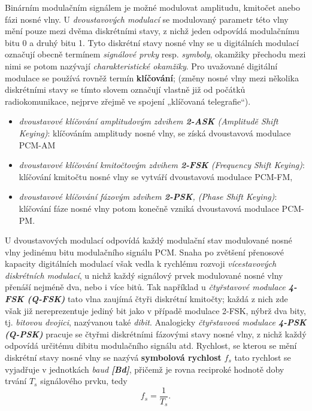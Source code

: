       Binárním modulačním signálem je možné modulovat amplitudu, kmitočet anebo fázi nosné vlny. U 
      \emph{dvoustavových modulací} se modulovaný parametr této vlny mění pouze mezi dvěma diskrétními stavy, 
      z nichž jeden odpovídá modulačnímu bitu 0 a druhý bitu 1. Tyto diskrétní stavy nosné vlny se u 
      digitálních modulací označují obecně termínem \emph{signálové prvky} resp. \emph{symboly}, okamžiky 
      přechodu mezi nimi se potom nazývají \emph{charakteristické okamžiky}. Pro uvažované digitální modulace 
      se používá rovněž termín \textbf{klíčování}; (změny nosné vlny mezi několika diskrétními stavy se tímto 
      slovem označují vlastně již od počátků radiokomunikace, nejprve zřejmě ve spojení „klíčovaná 
      telegrafie“).
      \begin{itemize}
        \item \emph{dvoustavové klíčování amplitudovým zdvihem \textbf{2-ASK} (Amplitudě Shift Keying)}: 
              klíčováním amplitudy nosné vlny, se získá dvoustavová modulace PCM-AM
        \item \emph{dvoustavové klíčování kmitočtovým zdvihem \textbf{2-FSK} (Frequency Shift Keying)}:  
              klíčování kmitočtu nosné vlny se vytváří dvoustavová modulace PCM-FM,
        \item \emph{dvoustavové klíčování fázovým zdvihem \textbf{2-PSK}, (Phase Shift Keying)}: 
              klíčování fáze nosné vlny potom konečně vzniká dvoustavová modulace PCM-PM.
      \end{itemize}
      U dvoustavových modulací odpovídá každý modulační stav modulované nosné vlny jedinému bitu modulačního 
      signálu PCM. Snaha po zvětšení přenosové kapacity digitálních modulací však vedla k rychlému rozvoji 
      \emph{vícestavových diskrétních modulací}, u nichž každý signálový prvek modulované nosné vlny přenáší 
      nejméně dva, nebo i více bitů. Tak například u \emph{čtyřstavové modulace \textbf{4-FSK (Q-FSK)}} tato 
      vlna zaujímá čtyři diskrétní kmitočty; každá z nich zde však již nereprezentuje jediný bit jako v 
      případě modulace 2-FSK, nýbrž dva bity, tj. \emph{bitovou dvojici}, nazývanou také \emph{dibit}. 
      Analogicky \emph{čtyřstavová modulace \textbf{4-PSK (Q-PSK)}} pracuje se čtyřmi diskrétními fázovými 
      stavy nosné vlny, z nichž každý odpovídá určitému dibitu modulačního signálu atd. Rychlost, se kterou 
      se mění diskrétní stavy nosné vlny se nazývá \textbf{symbolová rychlost} \(f_s\) tato rychlost se 
      vyjadřuje v jednotkách \emph{baud \textbf{[Bd]}}, přičemž je rovna reciproké hodnotě doby trvání 
      \(T_s\) signálového prvku, tedy\[f_s = \frac{1}{T_s}.\]
      
